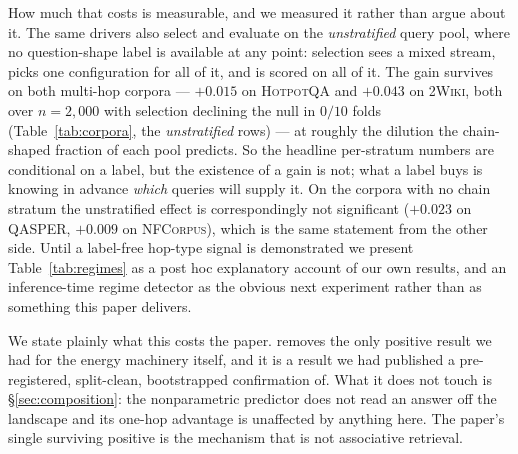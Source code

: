 How much that costs is measurable, and we measured it rather than argue about it. The same
drivers also select and evaluate on the \emph{unstratified} query pool, where no
question-shape label is available at any point: selection sees a mixed stream, picks one
configuration for all of it, and is scored on all of it. The gain survives on both multi-hop
corpora --- $+0.015$  on \textsc{HotpotQA} and $+0.043$
 on \textsc{2Wiki}, both over $n{=}2{,}000$ with selection declining the
null in $0/10$ folds (Table~\ref{tab:corpora}, the \emph{unstratified} rows) --- at roughly
the dilution the chain-shaped fraction of each pool predicts. So the headline per-stratum
numbers are conditional on a label, but the existence of a gain is not; what a label buys is
knowing in advance \emph{which} queries will supply it. On the corpora with no chain stratum
the unstratified effect is correspondingly not significant ($+0.023$  on
\textsc{QASPER}, $+0.009$  on \textsc{NFCorpus}), which is the same
statement from the other side. Until a label-free hop-type signal is demonstrated we present
Table~\ref{tab:regimes} as a post hoc explanatory account of our own results, and an
inference-time regime detector as the obvious next experiment rather than as something this
paper delivers.

We state plainly what this costs the paper.  removes the only positive result we
had for the energy machinery itself, and it is a result we had published a pre-registered,
split-clean, bootstrapped confirmation of. What it does not touch is
\S\ref{sec:composition}: the nonparametric predictor does not read an answer off the
landscape and its one-hop advantage is unaffected by anything here. The paper's single
surviving positive is the mechanism that is not associative retrieval.
